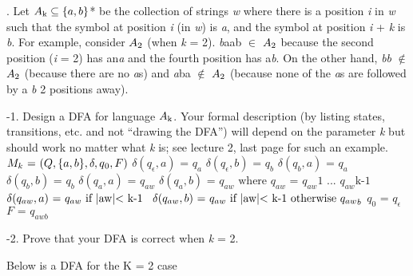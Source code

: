 \documentclass[12pt]{report}
\begin{document}
\newpage
{}. Let $A\textsubscript k \subseteq \{a,b\}$* be the collection of strings \textit w where there is a position \textit i in \textit w such that the symbol at position \textit i (in \textit w) is \textit a, and the symbol at position \textit i + \textit k is \textit b. For example, consider $A \textsubscript 2$ (when \textit k = 2). \textit baab $\in$ $A \textsubscript 2$ because the second position (\textit i = 2) has an\textit a and the fourth position has a\textit b. On the other hand, \textit b\textit b $\notin$ $A \textsubscript 2$ (because there are no \textit as) and \textit aba $\notin$ $A \textsubscript 2$ (because none of the \textit as are followed by a \textit b 2 positions away).
\newline

-1. Design a DFA for language $A\textsubscript k$. Your formal description (by listing states, transitions, etc. and not “drawing the DFA”) will depend on the parameter \textit k but should work no matter what \textit k is; see lecture 2, last page for such an example.
\break \break
\noindent
$M_k\text{ = }(Q, \{a,b\}, \delta, q\textsubscript 0, F)$\break
$\delta (q_\epsilon, a)\text{ = }q_a$\break
$\delta (q_\epsilon, b)\text{ = }q_b$\break
$\delta (q_b, a)\text{ = }q_a$\break
$\delta (q_b, b)\text{ = }q_b$\break
$\delta (q_a, a)\text{ = }q_{aw}$\break
$\delta (q_a, b)\text{ = }q_{aw}$\break
$\text{where }q_{aw}\text{ = }q_{aw} \text{1 ... } q_{aw} \text{k-1}$\break
$\delta (q_{aw}, a)\text{  = }q_{aw}	\text{ if \textbar aw\textbar $<$  k-1 }$\break
$\delta (q_{aw}, b)\text{  = }q_{aw}	 \text{ if \textbar aw\textbar  $<$  k-1  otherwise  } {q_{aw}}_b$\break
$q_0\text{ = }q_\epsilon$\break
$F\text{ = }q_{awb}$\break


-2. Prove that your DFA is correct when \textit k = 2.

Below is a DFA for the K = 2 case
\end{document}
